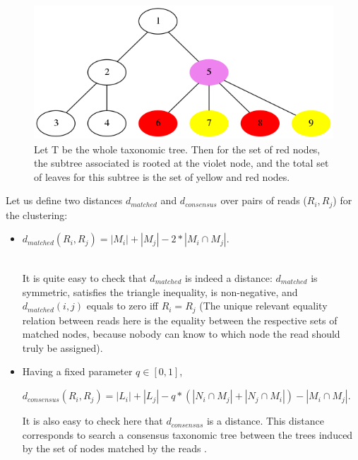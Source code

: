 \documentclass{beamer}
\begin{document}
\begin{frame}
\begin{figure}[H]
\centering
\includegraphics[scale=0.3]{illustrations/timili.png}
\caption{Let T be the whole taxonomic tree. Then for the set of red nodes, the subtree associated is rooted at the violet node, and the total set of leaves for this subtree is the set of yellow and red nodes.}
\end{figure}

Let us define two distances $d_{matched}$ and $d_{consensus}$ over pairs of reads ($R_{i},R_{j}$) for the clustering:
       \begin{itemize} 
       \item \begin{center} $d_{matched}(R_{i},R_{j}) = |M_{i}| + |M_{j}| - 2*|M_{i} \cap M_{j}|$. \end{center}\\ 

It is quite easy to check that $d_{matched}$ is indeed a distance: $d_{matched}$ is symmetric, satisfies the triangle inequality, is non-negative, and $d_{matched}(i,j)$ equals to zero iff $R_{i} = R_{j}$ (The unique relevant equality relation between reads here is the equality between the respective sets of matched nodes, because nobody can know to which node the read should truly be assigned).
       \item Having a fixed parameter $q \in [0,1]$,\\
\begin{center}
$d_{consensus}(R_{i},R_{j}) = |L_{i}| + |L_{j}| - q*(|N_{i}\cap M_{j}| + |N_{j} \cap M_{i}|) - |M_{i} \cap M_{j}|$.\\
\end{center}

It is also easy to check here that $d_{consensus}$ is a distance. This distance corresponds to search a consensus taxonomic tree between the trees induced by the set of nodes matched by the reads \cite{Consensus}.\\


\end{itemize}
\end{frame}
\end{document}
